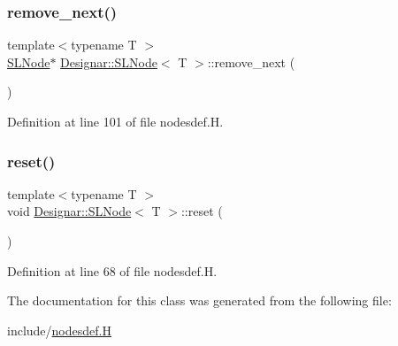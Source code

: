 \mbox{\label{class_designar_1_1_s_l_node_aa12ebd41228f87e9df06d5e74b7111e6}} 
\subsubsection{\texorpdfstring{remove\+\_\+next()}{remove\_next()}}
{\footnotesize\ttfamily template$<$typename T $>$ \\
\hyperlink{class_designar_1_1_s_l_node}{S\+L\+Node}$\ast$ \hyperlink{class_designar_1_1_s_l_node}{Designar\+::\+S\+L\+Node}$<$ T $>$\+::remove\+\_\+next (\begin{DoxyParamCaption}{ }\end{DoxyParamCaption})\hspace{0.3cm}{\ttfamily [inline]}}



Definition at line 101 of file nodesdef.\+H.

\mbox{\label{class_designar_1_1_s_l_node_ad837fcbb2d5d1fb1c7aa51392f6fdaae}} 
\subsubsection{\texorpdfstring{reset()}{reset()}}
{\footnotesize\ttfamily template$<$typename T $>$ \\
void \hyperlink{class_designar_1_1_s_l_node}{Designar\+::\+S\+L\+Node}$<$ T $>$\+::reset (\begin{DoxyParamCaption}{ }\end{DoxyParamCaption})\hspace{0.3cm}{\ttfamily [inline]}}



Definition at line 68 of file nodesdef.\+H.



The documentation for this class was generated from the following file\+:\begin{DoxyCompactItemize}
\item 
include/\hyperlink{nodesdef_8_h}{nodesdef.\+H}\end{DoxyCompactItemize}
